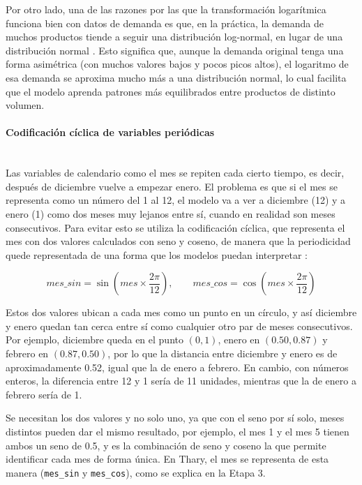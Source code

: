     Por otro lado, una de las razones por las que la transformación logarítmica funciona bien con datos de demanda es que, en la práctica, la demanda de muchos productos tiende a seguir una distribución log-normal, en lugar de una distribución normal \cite{cobb2013lognormal}. Esto significa que, aunque la demanda original tenga una forma asimétrica (con muchos valores bajos y pocos picos altos), el logaritmo de esa demanda se aproxima mucho más a una distribución normal, lo cual facilita que el modelo aprenda patrones más equilibrados entre productos de distinto volumen.

    \paragraph{Codificación cíclica de variables periódicas}\mbox{}\\
    Las variables de calendario como el mes se repiten cada cierto tiempo, es decir, después de diciembre vuelve a empezar enero. El problema es que si el mes se representa como un número del 1 al 12, el modelo va a ver a diciembre (12) y a enero (1) como dos meses muy lejanos entre sí, cuando en realidad son meses consecutivos. Para evitar esto se utiliza la codificación cíclica, que representa el mes con dos valores calculados con seno y coseno, de manera que la periodicidad quede representada de una forma que los modelos puedan interpretar \cite{jahin2025mcdfn}:

    \begin{equation}
    mes\_sin = \sin\left(mes \times \frac{2\pi}{12}\right), \qquad mes\_cos = \cos\left(mes \times \frac{2\pi}{12}\right)
    \end{equation}

    Estos dos valores ubican a cada mes como un punto en un círculo, y así diciembre y enero quedan tan cerca entre sí como cualquier otro par de meses consecutivos. Por ejemplo, diciembre queda en el punto $(0, 1)$, enero en $(0.50, 0.87)$ y febrero en $(0.87, 0.50)$, por lo que la distancia entre diciembre y enero es de aproximadamente 0.52, igual que la de enero a febrero. En cambio, con números enteros, la diferencia entre 12 y 1 sería de 11 unidades, mientras que la de enero a febrero sería de 1.

    Se necesitan los dos valores y no solo uno, ya que con el seno por sí solo, meses distintos pueden dar el mismo resultado, por ejemplo, el mes 1 y el mes 5 tienen ambos un seno de 0.5, y es la combinación de seno y coseno la que permite identificar cada mes de forma única. En Thary, el mes se representa de esta manera (\texttt{mes\_sin} y \texttt{mes\_cos}), como se explica en la Etapa 3.

